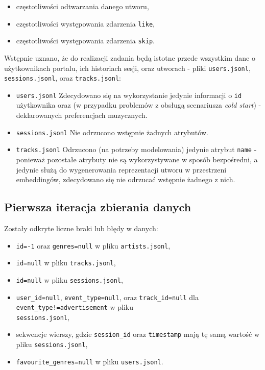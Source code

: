 \documentclass[10pt,a4paper]{article}
\begin{document}
\begin{itemize}

\item częstotliwości odtwarzania danego utworu,
\item częstotliwości występowania zdarzenia \texttt{like},
\item częstotliwości występowania zdarzenia \texttt{skip}.

\end{itemize}

Wstępnie uznano, że do realizacji zadania będą istotne przede wszystkim dane o użytkownikach portalu, ich historiach sesji, oraz utworach - pliki \texttt{users.jsonl}, \texttt{sessions.jsonl}, oraz \texttt{tracks.jsonl}:

\begin{itemize}
\item \texttt{users.jsonl}
    \subitem Zdecydowano się na wykorzystanie jedynie informacji o \texttt{id} użytkownika oraz (w przypadku problemów z obsługą scenariusza \textit{cold start}) - deklarowanych preferencjach muzycznych.
\item \texttt{sessions.jsonl}
    \subitem Nie odrzucono wstępnie żadnych atrybutów.
\item \texttt{tracks.jsonl}
    \subitem Odrzucono (na potrzeby modelowania) jedynie atrybut \texttt{name} - ponieważ pozostałe atrybuty nie są wykorzystywane w sposób bezpośredni, a jedynie służą do wygenerowania reprezentacji utworu w przestrzeni embeddingów, zdecydowano się nie odrzucać wstępnie żadnego z nich.

\end{itemize}

\subsection{Pierwsza iteracja zbierania danych}
Zostały odkryte liczne braki lub błędy w danych:
\begin{itemize}
\item \texttt{id=-1} oraz \texttt{genres=null} w pliku \texttt{artists.jsonl},
\item \texttt{id=null} w pliku \texttt{tracks.jsonl},
\item \texttt{id=null} w pliku \texttt{sessions.jsonl},
\item \texttt{user\_id=null}, \texttt{event\_type=null}, oraz \texttt{track\_id=null} dla \texttt{event\_type!=advertisement} w pliku\\ \texttt{sessions.jsonl},
\item sekwencje wierszy, gdzie \texttt{session\_id} oraz \texttt{timestamp} mają tę samą wartość w pliku \texttt{sessions.jsonl},
\item \texttt{favourite\_genres=null} w pliku \texttt{users.jsonl}.

\end{itemize}
\end{document}
